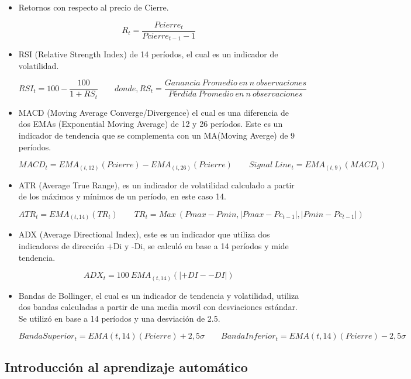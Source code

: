 \documentclass[a4paper,12pt]{Latex/Classes/PhDthesisPSnPDF}
\begin{document}
\begin{itemize}
\item Retornos con respecto al precio de Cierre.

$$ R_{t} = \frac{Pcierre_{t}}{Pcierre_{t-1}-1}$$

\item RSI (Relative Strength Index) de 14 períodos, el cual es un indicador de volatilidad.

$$ RSI_{t} = 100 - \frac{100}{1 + RS_{t}} \qquad 
donde, RS_{t} = \frac{Ganancia\ Promedio\ en\ n\ observaciones}{Pérdida\ Promedio\ en\ n\ observaciones}$$

\item MACD (Moving Average Converge/Divergence) el cual es una diferencia de dos EMAs (Exponential Moving Average) de 12 y 26 períodos. Este es un indicador de tendencia que se complementa con un MA(Moving Averge) de 9 períodos. 

$$ MACD_{t} =  EMA_{(t, 12)}(Pcierre) - EMA_{(t, 26)}(Pcierre) \qquad
Signal\ Line_{t} = EMA_{(t, 9)}(MACD_{t}) $$

\item ATR (Average True Range), es un indicador de volatilidad calculado a partir de los máximos y mínimos de un período, en este caso 14.

$$ ATR_{t} =  EMA_{(t, 14)}(TR_{t}) \qquad
TR_{t} = Max\ (Pmax - Pmin, |Pmax - Pc_{t-1}|, |Pmin - Pc_{t-1}|)$$

\item ADX (Average Directional Index), este es un indicador que utiliza dos indicadores de dirección +Di y -Di, se calculó en base a 14 períodos y mide tendencia.

$$ ADX_{t} =  100\ EMA_{(t, 14)}(|+DI - -DI|)$$

\item Bandas de Bollinger, el cual es un indicador de tendencia y volatilidad, utiliza dos bandas calculadas a partir de una media movil con desviaciones estándar. Se utilizó en base a 14 períodos y una desviación de 2.5.

$$ Banda Superior_{t} = EMA{(t, 14)}(Pcierre) + 2,5\sigma \qquad 
Banda Inferior_{t} = EMA{(t, 14)}(Pcierre) - 2,5\sigma $$

\end{itemize}

\subsection{Introducción al aprendizaje automático}
\end{document}
